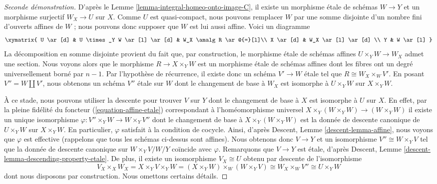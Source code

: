 \begin{proof}[Seconde d\'emonstration]
\medskip\noindent
D'apr\`es
le Lemme \ref{lemma-integral-homeo-onto-image-C},
il existe un morphisme \'etale de sch\'emas $W \to Y$ et un
morphisme surjectif $W_X \to U$ sur $X$.
Comme $U$ est quasi-compact, nous pouvons remplacer $W$ par une somme disjointe d'un
nombre fini d'ouverts affines de $W$ ; nous pouvons donc supposer que $W$
est lui aussi affine. Voici un diagramme
$$
\xymatrix{
U \ar[d] & U \times_Y W \ar[l] \ar[d] & W_X \amalg R \ar@{=}[l]\\
X \ar[d] & W_X \ar[l] \ar[d] \\
Y & W \ar[l]
}
$$
La d\'ecomposition en somme disjointe provient du fait que, par construction, le
morphisme \'etale de sch\'emas affines $U \times_Y W \to W_X$ admet une section.
Nous voyons alors que le morphisme $R \to X \times_Y W$ est un morphisme \'etale
de sch\'emas affines dont les fibres ont un degr\'e universellement born\'e
par $n - 1$. Par l'hypoth\`ese de r\'ecurrence, il existe donc un sch\'ema
$V' \to W$ \'etale tel que $R \cong W_X \times_W V'$.
En posant $V'' = W \amalg V'$, nous obtenons un sch\'ema $V''$ \'etale sur $W$ dont le
changement de base \`a $W_X$ est isomorphe \`a $U \times_Y W$
sur $X \times_Y W$.

\medskip\noindent
\`A ce stade, nous pouvons utiliser la descente pour trouver $V$ sur $Y$ dont le
changement de base \`a $X$ est isomorphe \`a $U$ sur $X$. En effet, par la pleine
fid\'elit\'e du foncteur (\ref{equation-affine-etale})
correspondant \`a l'hom\'eomorphisme universel
$X \times_Y (W \times_Y W) \to (W \times_Y W)$
il existe un unique isomorphisme $\varphi : V'' \times_Y W \to W \times_Y V''$
dont le changement de base \`a $X \times_Y (W \times_Y W)$ est la donn\'ee de
descente canonique de $U \times_Y W$ sur $X \times_Y W$. En particulier,
$\varphi$ satisfait \`a la condition de cocycle. Ainsi, d'apr\`es
Descent, Lemme \ref{descent-lemma-affine},
nous voyons que $\varphi$ est effective (rappelons que tous les sch\'emas ci-dessus sont affines).
Nous obtenons donc $V \to Y$ et un isomorphisme $V'' \cong W \times_Y V$
tel que la donn\'ee de descente canonique sur $W \times_Y V/W/Y$ co\"incide
avec $\varphi$. Remarquons que $V \to Y$ est \'etale, d'apr\`es
Descent, Lemme \ref{descent-lemma-descending-property-etale}.
De plus, il existe un isomorphisme $V_X \cong U$ obtenu par
descente de l'isomorphisme
$$
V_X \times_X W_X =
X \times_Y V \times_Y W =
(X \times_Y W) \times_W (W \times_Y V) \cong
W_X  \times_W V'' \cong U \times_Y W
$$
dont nous disposons par construction. Nous omettons certains d\'etails.
\end{proof}

